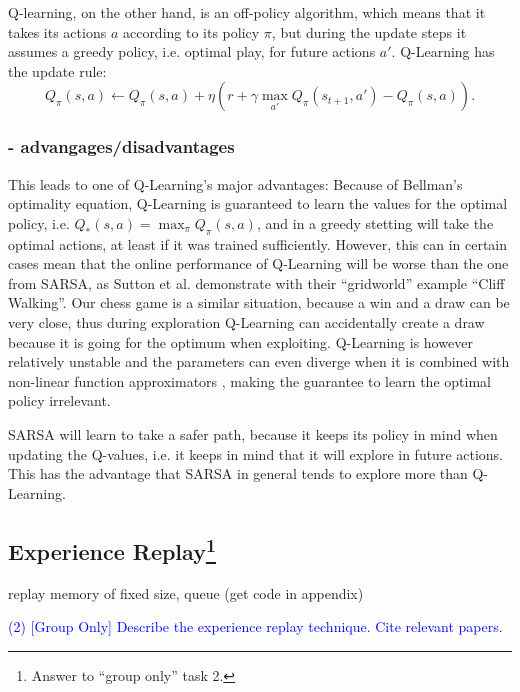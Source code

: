 \documentclass[conference]{IEEEtran}
\begin{document}
Q-learning, on the other hand, is an off-policy algorithm, which means that it takes its actions $a$ according to its policy $\pi$, but during the update steps it assumes a greedy policy, i.e. optimal play, for future actions $a'$. 
Q-Learning has the update rule: $$Q_\pi(s,a) \leftarrow Q_\pi(s,a) + \eta(r + \gamma \max_{a'} Q_\pi(s_{t+1},a') - Q_\pi(s,a)).$$ 

\subsubsection{- advangages/disadvantages}
This leads to one of Q-Learning's major advantages: Because of Bellman's optimality equation, Q-Learning is guaranteed to learn the values for the optimal policy, i.e. $Q_*(s,a) = \max_\pi Q_\pi(s,a)$, and in a greedy stetting will take the optimal actions, at least if it was trained sufficiently. However, this can in certain cases mean that the online performance of Q-Learning will be worse than the one from SARSA, as Sutton et al. \cite{sutton2018} demonstrate with their ``gridworld'' example ``Cliff Walking''. Our chess game is a similar situation, because a win and a draw can be very close, thus during exploration Q-Learning can accidentally create a draw because it is going for the optimum when exploiting. Q-Learning is however relatively unstable and the parameters can even diverge when it is combined with non-linear function approximators \cite{dqn2015}, making the guarantee to learn the optimal policy irrelevant.

SARSA will learn to take a safer path, because it keeps its policy in mind when updating the Q-values, i.e. it keeps in mind that it will explore in future actions. This has the advantage that SARSA in general tends to explore more than Q-Learning.




\subsection{Experience Replay\footnote{Answer to ``group only'' task 2.}}

replay memory of fixed size, queue (get code in appendix)



\textcolor{blue}{(2) [Group Only] Describe the experience replay technique. Cite relevant papers.}
\end{document}
